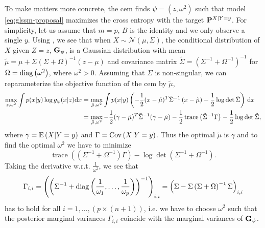 To make matters more concrete, the \gls{cem} finds $\psi = (z, \omega^{2})$ such that model \eqref{eq:glssm-proposal} maximizes the cross entropy with the target $\P^{X|Y=y}$. For simplicity, let us assume that $m = p$, $B$ is the identity and we only observe a single $y$. Using , we see that when $X\sim\mathcal N(\mu, \Sigma)$, the conditional distribution of $X$ given $Z=z$, $\G_{\psi}$, is a Gaussian distribution with mean $\tilde \mu =  \mu + \Sigma \left( \Sigma  + \Omega \right)^{-1} \left( z - \mu \right)$  and covariance matrix $\tilde\Sigma = \left( \Sigma ^{-1} + \Omega^{-1}\right)^{-1}$ for $\Omega = \diag \left( \omega^{2} \right)$, where $\omega^{2} > 0$. Assuming that $\Sigma$ is non-singular, we can reparameterize the objective function of the \gls{cem} by $\tilde \mu$,
\begin{align}
    \label{eq:cem_reparametrization}
    \begin{split}
    \max_{z, \omega^{2}} \int p(x|y) \log g_{\psi}(x|z) \mathrm dx &= \max_{\tilde\mu, \omega^{2}} \int p(x|y) \left( - \frac{1}{2} (x - \tilde \mu)^{T} \tilde \Sigma ^{-1} \left( x - \tilde \mu \right)  - \frac{1}{2} \log\det \tilde \Sigma \right)  \d x\\
&= \max_{\tilde \mu, \omega^{2}} - \frac{1}{2} (\gamma - \tilde \mu)^{T}\tilde \Sigma ^{-1} ( \gamma - \tilde \mu) - \frac{1}{2} \operatorname{trace} \left( \tilde \Sigma^{-1} \Gamma \right) - \frac{1}{2} \log\det\tilde\Sigma,
    \end{split}
\end{align}
where $\gamma = \E \left( X | Y = y \right)$ and $\Gamma = \cov \left( X | Y = y \right)$. 
Thus the optimal $\tilde \mu$ is $\gamma$ and to find the optimal $\omega^{2}$ we have to minimize 
$$
\operatorname{trace} \left( \left( \Sigma^{-1} + \Omega^{-1} \right) \Gamma \right) - \log\det \left( \Sigma^{-1} + \Omega^{-1} \right).
$$
Taking the derivative w.r.t. $\frac{1}{\omega^{2}}$, we see that 
\begin{align}
\label{eq:gamma_post}
\Gamma_{i,i} = \left(\left( \Sigma^{-1} + \diag \left( \frac{1}{\omega_{1}}, \dots, \frac{1}{\omega_{p}}\right) \right)^{-1}\right)_{i,i} = \left( \Sigma - \Sigma \left( \Sigma + \Omega \right)^{-1}\Sigma \right)_{i,i} %
\end{align}
has to hold for all $i = 1, \dots, (p \times (n + 1))$, i.e. we have to choose $\omega^{2}$ such that the posterior marginal variances $\Gamma_{i,i}$ coincide with the marginal variances of $\G_{\psi}$.

